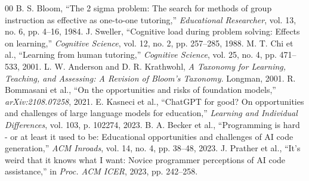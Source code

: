 \documentclass[conference]{IEEEtran}
\begin{document}
\begin{thebibliography}{00}
 B. S. Bloom, ``The 2 sigma problem: The search for methods of group instruction as effective as one-to-one tutoring,'' \textit{Educational Researcher}, vol. 13, no. 6, pp. 4--16, 1984.
 J. Sweller, ``Cognitive load during problem solving: Effects on learning,'' \textit{Cognitive Science}, vol. 12, no. 2, pp. 257--285, 1988.
 M. T. Chi et al., ``Learning from human tutoring,'' \textit{Cognitive Science}, vol. 25, no. 4, pp. 471--533, 2001.
 L. W. Anderson and D. R. Krathwohl, \textit{A Taxonomy for Learning, Teaching, and Assessing: A Revision of Bloom's Taxonomy}. Longman, 2001.
 R. Bommasani et al., ``On the opportunities and risks of foundation models,'' \textit{arXiv:2108.07258}, 2021.
 E. Kasneci et al., ``ChatGPT for good? On opportunities and challenges of large language models for education,'' \textit{Learning and Individual Differences}, vol. 103, p. 102274, 2023.
 B. A. Becker et al., ``Programming is hard - or at least it used to be: Educational opportunities and challenges of AI code generation,'' \textit{ACM Inroads}, vol. 14, no. 4, pp. 38--48, 2023.
 J. Prather et al., ``It's weird that it knows what I want: Novice programmer perceptions of AI code assistance,'' in \textit{Proc. ACM ICER}, 2023, pp. 242--258.
\end{thebibliography}
\end{document}

